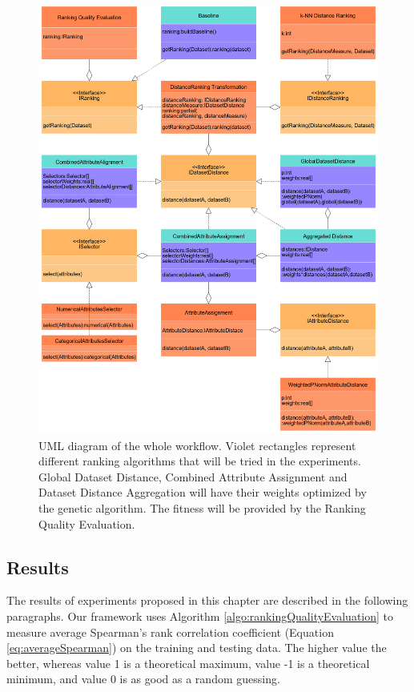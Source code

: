 \begin{figure}	
	\includegraphics[width=15cm]{Images/BigPictureMetrics.png}
	\centering
	\caption{UML diagram of the whole workflow. Violet rectangles represent different ranking algorithms that will be tried in the experiments. Global Dataset Distance, Combined Attribute Assignment and Dataset Distance Aggregation will have their weights optimized by the genetic algorithm. The fitness will be provided by the Ranking Quality Evaluation. }	
	\label{fig:BigPictureMetrics}	
\end{figure}

\subsection{Results}
The results of experiments proposed in this chapter are described in the following paragraphs. Our framework uses Algorithm \ref{algo:rankingQualityEvaluation} to measure average Spearman's rank correlation coefficient (Equation \ref{eq:averageSpearman}) on the training and testing data. The higher value the better, whereas value 1 is a theoretical maximum, value -1 is a theoretical minimum, and value 0 is as good as a random guessing.

